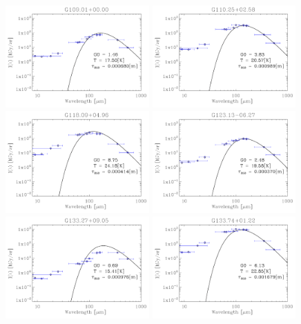 \begin{figure}
\includegraphics[trim=-1mm -1mm -1mm -1mm, clip, width=55mm]{appB/appB_30.pdf}
\includegraphics[trim=-1mm -1mm -1mm -1mm, clip, width=55mm]{appB/appB_31.pdf}
\includegraphics[trim=-1mm -1mm -1mm -1mm, clip, width=55mm]{appB/appB_32.pdf}
\includegraphics[trim=-1mm -1mm -1mm -1mm, clip, width=55mm]{appB/appB_33.pdf}
\includegraphics[trim=-1mm -1mm -1mm -1mm, clip, width=55mm]{appB/appB_34.pdf}
\includegraphics[trim=-1mm -1mm -1mm -1mm, clip, width=55mm]{appB/appB_35.pdf}
\end{figure}

